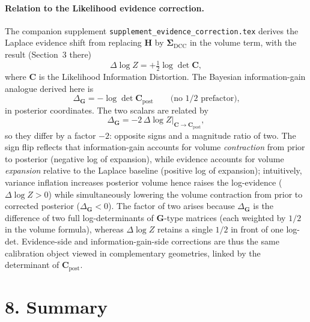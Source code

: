 \documentclass[11pt]{article}
\begin{document}
\paragraph{Relation to the Likelihood evidence correction.}
The companion supplement \texttt{supplement\_evidence\_correction.tex} derives the Laplace evidence shift from replacing $\mathbf H$ by $\boldsymbol\Sigma_{\mathrm{DCC}}$ in the volume term, with the result (Section~3 there)
\begin{equation}
\Delta \log Z = +\tfrac{1}{2}\log \det \mathbf C,
\label{eq:DeltaZ}
\end{equation}
where $\mathbf C$ is the Likelihood Information Distortion. The Bayesian information-gain analogue derived here is
\begin{equation}
\Delta_{\mathbf G} = -\log \det \mathbf C_{\mathrm{post}}
\qquad
\text{(no $1/2$ prefactor),}
\label{eq:DeltaG-restated}
\end{equation}
in posterior coordinates. The two scalars are related by
\begin{equation}
\Delta_{\mathbf G} = -2\, \Delta\log Z|_{\mathbf C \to \mathbf C_{\mathrm{post}}},
\label{eq:DeltaG-vs-DeltaZ}
\end{equation}
so they differ by a factor $-2$: opposite signs and a magnitude ratio of two. The sign flip reflects that information-gain accounts for volume \emph{contraction} from prior to posterior (negative log of expansion), while evidence accounts for volume \emph{expansion} relative to the Laplace baseline (positive log of expansion); intuitively, variance inflation increases posterior volume hence raises the log-evidence ($\Delta\log Z > 0$) while simultaneously lowering the volume contraction from prior to corrected posterior ($\Delta_{\mathbf G} < 0$). The factor of two arises because $\Delta_{\mathbf G}$ is the difference of two full log-determinants of $\mathbf G$-type matrices (each weighted by $1/2$ in the volume formula), whereas $\Delta\log Z$ retains a single $1/2$ in front of one log-det. Evidence-side and information-gain-side corrections are thus the same calibration object viewed in complementary geometries, linked by the determinant of $\mathbf C_{\mathrm{post}}$.

\section*{8. Summary}
\end{document}
